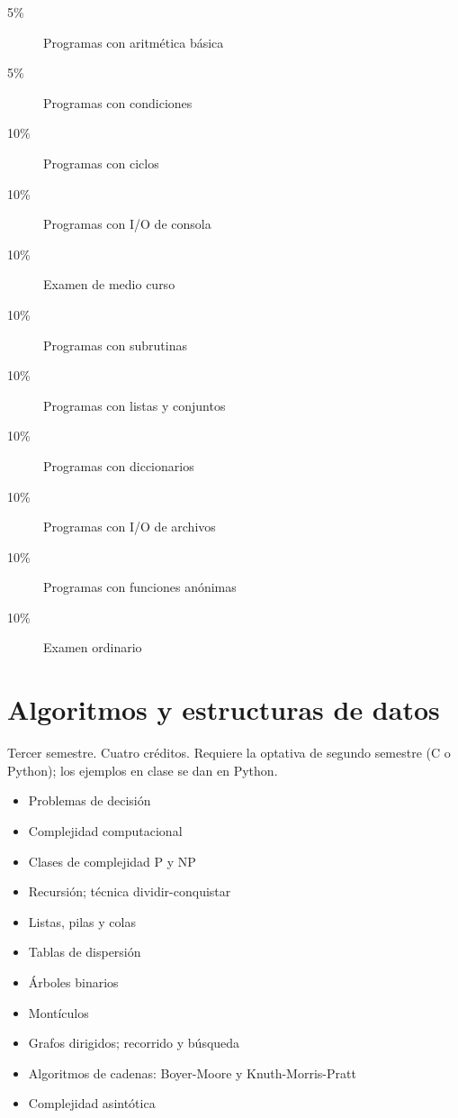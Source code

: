 \documentclass{article}
\begin{document}
\begin{multicols}{4}
\begin{description}
\item[5\%]{Programas con aritm\'{e}tica b\'{a}sica}
\item[5\%]{Programas con condiciones} 
\item[10\%]{Programas con ciclos}
\item[10\%]{Programas con I/O de consola}
\item[10\%]{Examen de medio curso}
\item[10\%]{Programas con subrutinas}
\item[10\%]{Programas con listas y conjuntos}
\item[10\%]{Programas con diccionarios}
\item[10\%]{Programas con I/O de archivos}              
\item[10\%]{Programas con funciones an\'{o}nimas}
\item[10\%]{Examen ordinario}
\end{description}

\vfill\null \columnbreak

\hypertarget{ayedd}{\section*{Algoritmos y estructuras de datos}} 

Tercer semestre. Cuatro cr\'{e}ditos. Requiere la optativa de segundo
semestre (C o Python); los ejemplos en clase se dan en Python.

\begin{itemize}
\item{Problemas de decisi\'{o}n}
\item{Complejidad computacional}
\item{Clases de complejidad P y NP}    
\item{Recursi\'{o}n; t\'{e}cnica dividir-conquistar}
\item{Listas, pilas y colas}
\item{Tablas de dispersi\'{o}n}
\item{\'{A}rboles binarios}
\item{Mont\'{i}culos}
\item{Grafos dirigidos; recorrido y b\'{u}squeda}
\item{Algoritmos de cadenas: Boyer-Moore y Knuth-Morris-Pratt}
\item{Complejidad asint\'{o}tica}
\end{itemize}

\begin{description}


\end{description}
\end{multicols}
\end{document}

